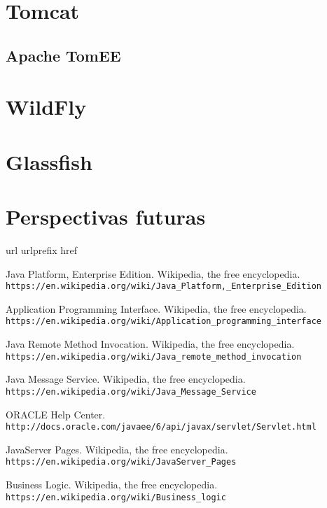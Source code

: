 \documentclass[a4paper, 10pt]{article}
\begin{document}
\section{Tomcat}

	\subsection{Apache TomEE}

\section{WildFly}


\section{Glassfish}

\section{Perspectivas futuras}

\newpage
\begin{thebibliography}{10}
	\expandafter\ifx\csname url\endcsname\relax
	  \def\url#1{\texttt{#1}}\fi
	\expandafter\ifx\csname urlprefix\endcsname\relax\def\urlprefix{URL }\fi
	\expandafter\ifx\csname href\endcsname\relax
	  \def\href#1#2{#2} \def\path#1{#1}\fi
	
	Java Platform, Enterprise Edition. Wikipedia, the free encyclopedia.\\
		\url{https://en.wikipedia.org/wiki/Java_Platform,_Enterprise_Edition}
	
	Application Programming Interface. Wikipedia, the free encyclopedia.\\
		\url{https://en.wikipedia.org/wiki/Application_programming_interface}
	
	Java Remote Method Invocation. Wikipedia, the free encyclopedia.\\
		\url{https://en.wikipedia.org/wiki/Java_remote_method_invocation}
	
	Java Message Service. Wikipedia, the free encyclopedia.\\
		\url{https://en.wikipedia.org/wiki/Java_Message_Service}
	
	ORACLE Help Center.\\
		\url{http://docs.oracle.com/javaee/6/api/javax/servlet/Servlet.html}
	
	JavaServer Pages. Wikipedia, the free encyclopedia.\\
		\url{https://en.wikipedia.org/wiki/JavaServer_Pages}
	
	Business Logic. Wikipedia, the free encyclopedia.\\
		\url{https://en.wikipedia.org/wiki/Business_logic}
	
\end{thebibliography}
\end{document}

